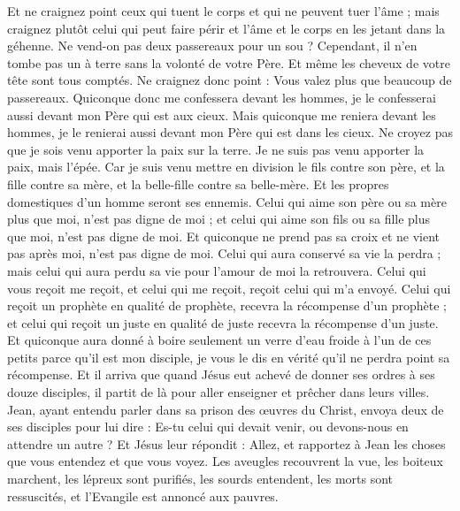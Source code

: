 \begin{multicols}{2}
Et ne craignez point ceux qui tuent le corps et qui ne peuvent tuer l'âme ; mais craignez plutôt celui qui peut faire périr et l'âme et le corps en les jetant dans la géhenne.
Ne vend-on pas deux passereaux pour un sou ? Cependant, il n'en tombe pas un à terre sans la volonté de votre Père.
Et même les cheveux de votre tête sont tous comptés.
Ne craignez donc point : Vous valez plus que beaucoup de passereaux.
Quiconque donc me confessera devant les hommes, je le confesserai aussi devant mon Père qui est aux cieux.
Mais quiconque me reniera devant les hommes, je le renierai aussi devant mon Père qui est dans les cieux.
Ne croyez pas que je sois venu apporter la paix sur la terre. Je ne suis pas venu apporter la paix, mais l'épée.
Car je suis venu mettre en division le fils contre son père, et la fille contre sa mère, et la belle-fille contre sa belle-mère.
Et les propres domestiques d'un homme seront ses ennemis.
Celui qui aime son père ou sa mère plus que moi, n'est pas digne de moi ; et celui qui aime son fils ou sa fille plus que moi, n'est pas digne de moi.
Et quiconque ne prend pas sa croix et ne vient pas après moi, n'est pas digne de moi.
Celui qui aura conservé sa vie la perdra ; mais celui qui aura perdu sa vie pour l'amour de moi la retrouvera.
Celui qui vous reçoit me reçoit, et celui qui me reçoit, reçoit celui qui m'a envoyé.
Celui qui reçoit un prophète en qualité de prophète, recevra la récompense d'un prophète ; et celui qui reçoit un juste en qualité de juste recevra la récompense d'un juste.
Et quiconque aura donné à boire seulement un verre d'eau froide à l'un de ces petits parce qu'il est mon disciple, je vous le dis en vérité qu'il ne perdra point sa récompense.
\VerseOne{}Et il arriva que quand Jésus eut achevé de donner ses ordres à ses douze disciples, il partit de là pour aller enseigner et prêcher dans leurs villes.
Jean, ayant entendu parler dans sa prison des œuvres du Christ, envoya deux de ses disciples pour lui dire :
Es-tu celui qui devait venir, ou devons-nous en attendre un autre ?
Et Jésus leur répondit : Allez, et rapportez à Jean les choses que vous entendez et que vous voyez.
Les aveugles recouvrent la vue, les boiteux marchent, les lépreux sont purifiés, les sourds entendent, les morts sont ressuscités, et l'Evangile est annoncé aux pauvres.

\end{multicols}
